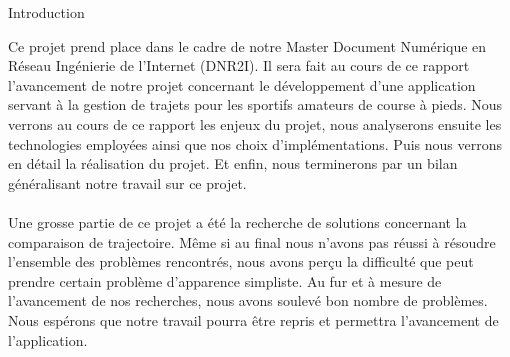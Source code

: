 {\Huge{Introduction}}

\vspace{2cm}
Ce projet prend place dans le cadre de notre Master Document Numérique en Réseau Ingénierie de l'Internet (DNR2I). Il sera fait au cours de ce rapport l'avancement de notre projet concernant le développement d'une application servant à la gestion de trajets pour les sportifs amateurs de course à pieds. Nous verrons au cours de ce rapport les enjeux du projet, nous analyserons ensuite les technologies employées ainsi que nos choix d'implémentations. Puis nous verrons en détail la réalisation du projet. Et enfin, nous terminerons par un bilan généralisant notre travail sur ce projet.
\paragraph{}
Une grosse partie de ce projet a été la recherche de solutions concernant la comparaison de trajectoire. Même si au final nous n'avons pas réussi à résoudre l'ensemble des problèmes rencontrés, nous avons perçu la difficulté que peut prendre certain problème d'apparence simpliste. Au fur et à mesure de l'avancement de nos recherches, nous avons soulevé bon nombre de problèmes. Nous espérons que notre travail pourra être repris et permettra l'avancement de l'application.